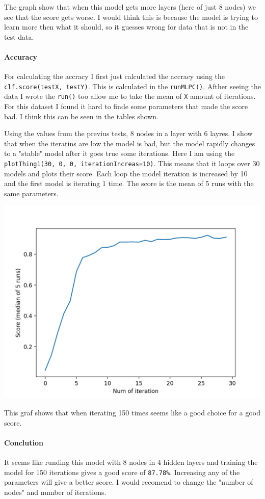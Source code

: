 \documentclass[10pt]{article}
\begin{document}
        The graph show that when this model gets more layers (here of just 8 nodes) we see that the score gets worse. I would think this is because the model is trying to learn more then what it should, so it guesses wrong for data that is not in the test data.        

        \paragraph{Accuracy}
        For calculating the accracy I first just calculated the accracy using the \texttt{clf.score(testX, testY)}. This is calculated in the \texttt{runMLPC()}. Afther seeing the data I wrote the \texttt{run()} too allow me to take the mean of \texttt{X} amount of iterations. For this dataset I found it hard to finde some parameters that made the score bad. I think this can be seen in the tables shown. 

        Using the values from the previus tests, 8 nodes in a layer with 6 layres. I show that when the iteratins are low the model is bad, but the model rapidly changes to a "stable" model after it goes true some iterations. Here I am using the \texttt{plotThing1(30, 0, 0, iterationIncreas=10)}. This means that it loops over 30 models and plots their score. Each loop the model iteration is increased by 10 and the first model is iterating 1 time. The score is the mean of 5 runs with the same parameters.

        \begin{center}
            \includegraphics[scale=0.35]{Figure_3}
        \end{center}

        This graf shows that when iterating 150 times seems like a good choice for a good score.

        \paragraph{Conclution}
        It seems like runding this model with 8 nodes in 4 hidden layers and training the model for 150 iterations gives a good score of \texttt{87.78\%}. Increasing any of the parameters will give a better score. I would recomend to change the "number of nodes" and number of iterations.
\end{document}
